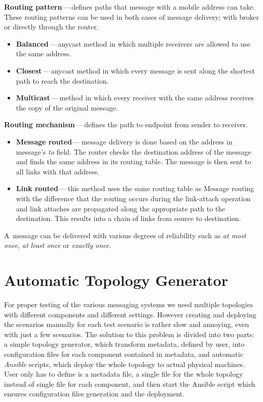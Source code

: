 \begin{description}
	\setlength\itemsep{0em}
	\item \textbf{Routing pattern}\,---\,defines paths that message with a mobile address can take. These routing patterns can be used in both cases of message delivery; with broker or directly through the router.
	\begin{itemize}
		\setlength\itemsep{0em}
		\item \textbf{Balanced}\,---\,anycast\footnotemark{} method in which multiple receivers are allowed to use the same address.
		\item \textbf{Closest}\,---\,anycast method in which every message is sent along the shortest path to reach the destination.
		\item \textbf{Multicast}\,---\,method in which every receiver with the same address receives the copy of the original message.
	\end{itemize}
	\item \textbf{Routing mechanism}\,---\,defines the path to endpoint from sender to receiver.
	\begin{itemize}
		\setlength\itemsep{0em}
		\item \textbf{Message routed}\,---\,message delivery is done based on the address in message's \emph{to} field. The router checks the destination address of the message and finds the same address in its routing table. The message is then sent to all links with that address.
		\item \textbf{Link routed}\,---\,this method uses the same routing table as Message routing with the difference that the routing occurs during the link-attach operation and link attaches are propagated along the appropriate path to the destination. This results into a chain of links from source to destination.
	\end{itemize}
\end{description}
A~message can be delivered with various degrees of reliability such as \emph{at most once}, \emph{at least once} or \emph{exactly once}.


\section{Automatic Topology Generator}
For proper testing of the various messaging systems we need multiple topologies with different components and different settings. However creating and deploying the scenarios manually for each test scenario is rather slow and annoying, even with just a few scenarios. The solution to this problem is divided into two parts: a simple topology generator, which transform metadata, defined by user, into configuration files for each component contained in metadata, and automatic \emph{Ansible} scripts, which deploy the whole topology to actual physical machines. User only has to define is a metadata file, a single file for the whole topology instead of single file for each component, and then start the Ansible script which ensures configuration files generation and the deployment.


